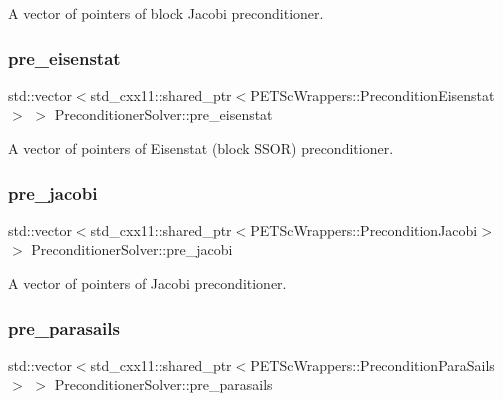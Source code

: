 A vector of pointers of block Jacobi preconditioner. 

\mbox{\label{class_preconditioner_solver_aab4bd157aebca7681283ff6cf0e69392}} 
\subsubsection{\texorpdfstring{pre\+\_\+eisenstat}{pre\_eisenstat}}
{\footnotesize\ttfamily std\+::vector$<$std\+\_\+cxx11\+::shared\+\_\+ptr$<$P\+E\+T\+Sc\+Wrappers\+::\+Precondition\+Eisenstat$>$ $>$ Preconditioner\+Solver\+::pre\+\_\+eisenstat\hspace{0.3cm}{\ttfamily [private]}}



A vector of pointers of Eisenstat (block S\+S\+OR) preconditioner. 

\mbox{\label{class_preconditioner_solver_ab2379323cfbca020045ec5dd4ab708dc}} 
\subsubsection{\texorpdfstring{pre\+\_\+jacobi}{pre\_jacobi}}
{\footnotesize\ttfamily std\+::vector$<$std\+\_\+cxx11\+::shared\+\_\+ptr$<$P\+E\+T\+Sc\+Wrappers\+::\+Precondition\+Jacobi$>$ $>$ Preconditioner\+Solver\+::pre\+\_\+jacobi\hspace{0.3cm}{\ttfamily [private]}}



A vector of pointers of Jacobi preconditioner. 

\mbox{\label{class_preconditioner_solver_a90b15442f60786b56729f2756e191336}} 
\subsubsection{\texorpdfstring{pre\+\_\+parasails}{pre\_parasails}}
{\footnotesize\ttfamily std\+::vector$<$std\+\_\+cxx11\+::shared\+\_\+ptr$<$P\+E\+T\+Sc\+Wrappers\+::\+Precondition\+Para\+Sails$>$ $>$ Preconditioner\+Solver\+::pre\+\_\+parasails\hspace{0.3cm}{\ttfamily [private]}}



